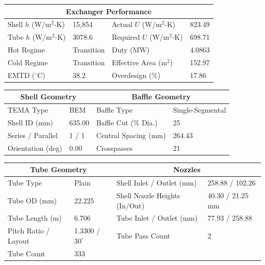 \documentclass[12pt]{article}
\begin{document}
\begin{table}[H]
\centering
\small
\begin{tabular}{ll|ll}
\toprule
\multicolumn{4}{c}{\textbf{Exchanger Performance}} \\
\midrule
Shell $h$ (W/m$^2$-K) & 15{,}854 & Actual $U$ (W/m$^2$-K) & 823.49 \\
Tube $h$ (W/m$^2$-K) & 3078.6 & Required $U$ (W/m$^2$-K) & 698.71 \\
Hot Regime & Transition & Duty (MW) & 4.0863 \\
Cold Regime & Transition & Effective Area (m$^2$) & 152.97 \\
EMTD ($^\circ$C) & 38.2 & Overdesign (\%) & 17.86 \\
\bottomrule
\end{tabular}
\end{table}

\begin{table}[H]
\centering
\small
\begin{tabular}{ll|ll}
\toprule
\multicolumn{2}{c}{\textbf{Shell Geometry}} & \multicolumn{2}{c}{\textbf{Baffle Geometry}} \\
\midrule
TEMA Type & BEM & Baffle Type & Single-Segmental \\
Shell ID (mm) & 635.00 & Baffle Cut (\% Dia.) & 25 \\
Series / Parallel & 1 / 1 & Central Spacing (mm) & 264.43 \\
Orientation (deg) & 0.00 & Crosspasses & 21 \\
\bottomrule
\end{tabular}
\end{table}

\begin{table}[H]
\centering
\small
\begin{tabular}{ll|ll}
\toprule
\multicolumn{2}{c}{\textbf{Tube Geometry}} & \multicolumn{2}{c}{\textbf{Nozzles}} \\
\midrule
Tube Type & Plain & Shell Inlet / Outlet (mm) & 258.88 / 102.26 \\
Tube OD (mm) & 22.225 & Shell Nozzle Heights (In/Out) & 40.30 / 21.25 mm \\
Tube Length (m) & 6.706 & Tube Inlet / Outlet (mm) & 77.93 / 258.88 \\
Pitch Ratio / Layout & 1.3300 / $30^\circ$ & Tube Pass Count & 2 \\
Tube Count & 333 & & \\
\bottomrule
\end{tabular}
\end{table}
\end{document}
